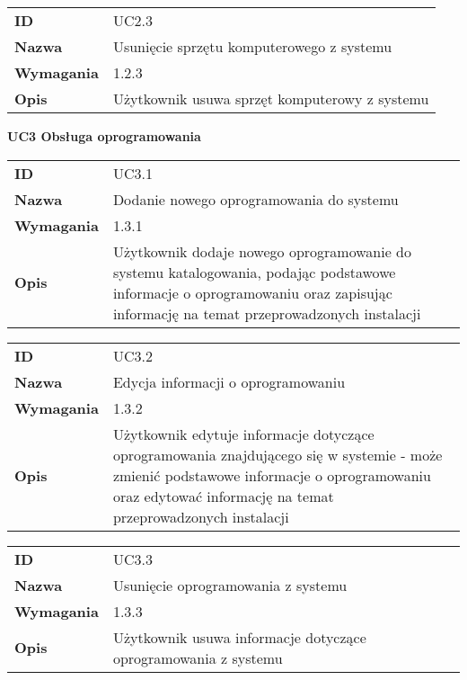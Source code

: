 \vspace{.05\textheight}

\begin{tabular}{p{}p{}}
\hfill {\bf ID} & UC2.3 \\
\hfill {\bf Nazwa} & Usunięcie sprzętu komputerowego z systemu \\
\hfill {\bf Wymagania} & 1.2.3 \\
\hfill {\bf Opis} & Użytkownik usuwa sprzęt komputerowy z systemu \\
\end{tabular}

\vspace{.03\textheight}
\begin{center}
  {\Large\bf UC3 Obsługa oprogramowania} \\
\end{center}
\vspace{.02\textheight}


\begin{tabular}{p{}p{}}
\hfill {\bf ID} & UC3.1 \\
\hfill {\bf Nazwa} & Dodanie nowego oprogramowania do systemu \\
\hfill {\bf Wymagania} & 1.3.1 \\
\hfill {\bf Opis} & Użytkownik dodaje nowego oprogramowanie do systemu katalogowania, podając podstawowe informacje o oprogramowaniu oraz zapisując informację na temat przeprowadzonych instalacji \\
\end{tabular}

\vspace{.05\textheight}

\begin{tabular}{p{}p{}}
\hfill {\bf ID} & UC3.2 \\
\hfill {\bf Nazwa} &  Edycja informacji o oprogramowaniu \\
\hfill {\bf Wymagania} & 1.3.2 \\
\hfill {\bf Opis} & Użytkownik edytuje informacje dotyczące oprogramowania znajdującego się w systemie - może zmienić podstawowe informacje o oprogramowaniu oraz edytować informację na temat przeprowadzonych instalacji \\
\end{tabular}

\vspace{.05\textheight}

\begin{tabular}{p{}p{}}
\hfill {\bf ID} & UC3.3 \\
\hfill {\bf Nazwa} & Usunięcie oprogramowania z systemu \\
\hfill {\bf Wymagania} & 1.3.3 \\
\hfill {\bf Opis} & Użytkownik usuwa informacje dotyczące oprogramowania z systemu \\
\end{tabular}

